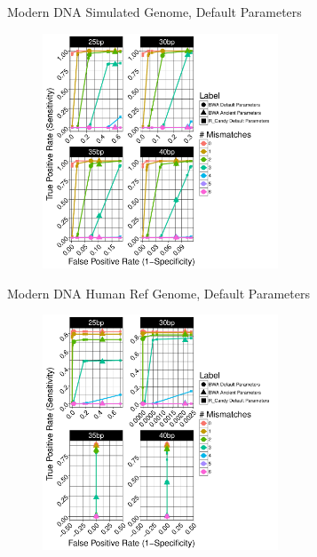 \documentclass{beamer}
\begin{document}
\begin{frame}{\small{Modern DNA Simulated Genome, Default Parameters}}
	
	\begin{figure}[H]
\centering
\includegraphics[width=7cm]{pics/f_DS3_emp.pdf}
\end{figure}
\end{frame}

\begin{frame}{\small{Modern DNA Human Ref Genome, Default Parameters}}
	
	\begin{figure}[H]
		\centering
		\includegraphics[width=7cm]{pics/f_DS6_emp.pdf}
		
	\end{figure}

\end{frame}
\end{document}
